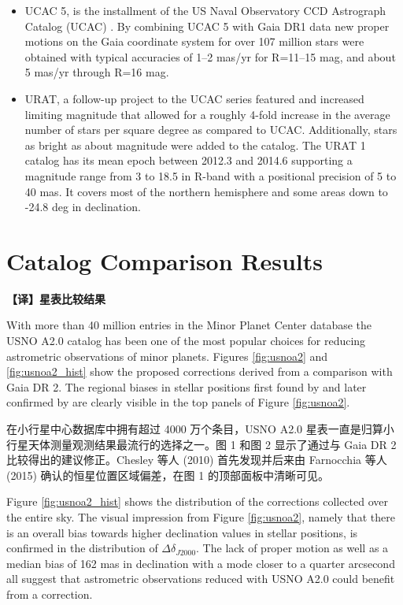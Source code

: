 \documentclass[review]{elsarticle}
\begin{document}
\begin{itemize}
\item UCAC 5, is the  installment of the US Naval Observatory CCD Astrograph Catalog (UCAC) \citep{ucac5}. By combining UCAC 5 with Gaia DR1 data new proper motions on the Gaia coordinate system for over 107 million stars were obtained with typical accuracies of 1--2 mas/yr for R=11--15 mag, and about 5 mas/yr through R=16 mag.

\item URAT, a follow-up project to the UCAC series featured and increased limiting magnitude that allowed for a roughly 4-fold increase in the average number of stars per square degree as compared to UCAC. Additionally, stars as bright as about  magnitude were added to the catalog. The URAT 1 catalog \citep{urat1} has its mean epoch between 2012.3 and 2014.6 supporting a magnitude range from 3 to 18.5 in R-band with a positional precision of 5 to 40 mas. It covers most of the northern hemisphere and some areas down to -24.8 deg in declination.
\end{itemize}
\section{Catalog Comparison Results}
\textbf{【译】星表比较结果}
\label{sec:catresults}

With more than 40 million entries in the Minor Planet Center database the USNO A2.0 catalog has been one of the most popular choices for reducing astrometric observations of minor planets.
Figures \ref{fig:usnoa2} and \ref{fig:usnoa2_hist} show the proposed corrections derived from a comparison with Gaia DR 2.
The regional biases in stellar positions first found by \citet{chesley10} and later confirmed by \citet{farnocchia15} are clearly visible in the top panels of Figure \ref{fig:usnoa2}.

在小行星中心数据库中拥有超过 4000 万个条目，USNO A2.0 星表一直是归算小行星天体测量观测结果最流行的选择之一。图 1 和图 2 显示了通过与 Gaia DR 2 比较得出的建议修正。Chesley 等人 (2010) 首先发现并后来由 Farnocchia 等人 (2015) 确认的恒星位置区域偏差，在图 1 的顶部面板中清晰可见。

%
Figure \ref{fig:usnoa2_hist} shows the distribution of the corrections collected over the entire sky. The visual impression from Figure \ref{fig:usnoa2}, namely that there is an overall bias towards higher declination values in stellar positions, is confirmed in the distribution of $\Delta \delta_{J2000}$. The lack of proper motion as well as a median bias of 162 mas in declination with a mode closer to a quarter arcsecond all suggest that astrometric observations reduced with USNO A2.0 could benefit from a correction. 
\end{document}
